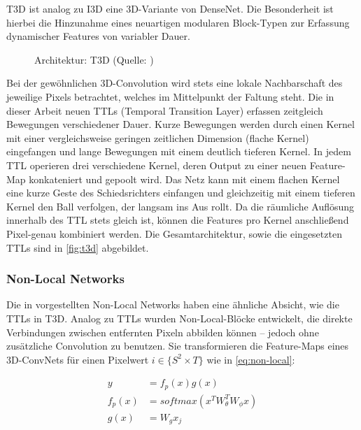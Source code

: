 T3D \cite{Diba17} ist analog zu I3D eine 3D-Variante von DenseNet.
Die Besonderheit ist hierbei die Hinzunahme eines neuartigen modularen Block-Typen zur Erfassung dynamischer Features von variabler Dauer.

\begin{figure}[h!]
    \centering
    \caption{Architektur: T3D (Quelle: \cite{Diba17})}
    \label{fig:t3d}
\end{figure}

Bei der gewöhnlichen 3D-Convolution wird stets eine lokale Nachbarschaft des jeweilige Pixels betrachtet, welches im Mittelpunkt der Faltung steht.
Die in dieser Arbeit neuen TTLs (Temporal Transition Layer) erfassen zeitgleich Bewegungen verschiedener Dauer.
Kurze Bewegungen werden durch einen Kernel mit einer vergleichsweise geringen zeitlichen Dimension (flache Kernel) eingefangen und lange Bewegungen mit einem deutlich tieferen Kernel.
In jedem TTL operieren drei verschiedene Kernel, deren Output zu einer neuen Feature-Map konkateniert und gepoolt wird.
Das Netz kann mit einem flachen Kernel \zB eine kurze Geste des Schiedsrichters einfangen und gleichzeitig mit einem tieferen Kernel den Ball verfolgen, der langsam ins Aus rollt.
Da die räumliche Auflösung innerhalb des TTL stets gleich ist, können die Features pro Kernel anschließend Pixel-genau kombiniert werden.
Die Gesamtarchitektur, sowie die eingesetzten TTLs sind in \autoref{fig:t3d} abgebildet.

\subsubsection*{Non-Local Networks}

Die in \cite{Wang18} vorgestellten Non-Local Networks haben eine ähnliche Absicht, wie die TTLs in T3D.
Analog zu TTLs wurden Non-Local-Blöcke entwickelt, die direkte Verbindungen zwischen entfernten Pixeln abbilden können -- jedoch ohne zusätzliche Convolution zu benutzen.
Sie transformieren die Feature-Maps eines 3D-ConvNets für einen Pixelwert $i \in \{S^2 \times T\}$ wie in \autoref{eq:non-local}:

\begin{equation}
\label{eq:non-local}
\begin{split}
    y           & = f_p(x) g(x) \\
    f_p(x)      & = softmax(x^T W^T_\theta W_\phi x) \\
    g(x)        & = W_g x_j
\end{split}
\end{equation}

